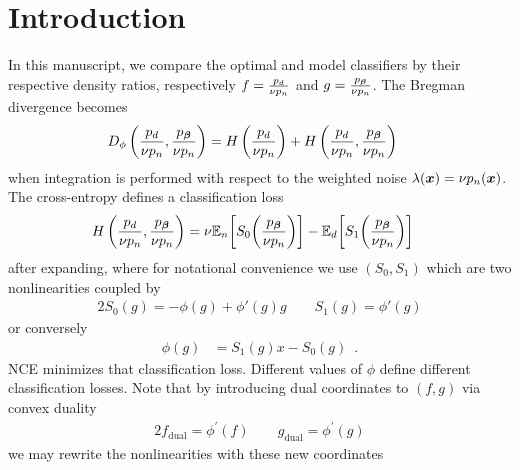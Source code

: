 
\newcommand{\pd}{{\color{black} p_d}}
\newcommand{\pn}{{\color{black} p_n}}

\section{Introduction}
\label{sec:intro}


In this manuscript, we compare the optimal and model classifiers by their respective density ratios, respectively $f = \frac{\pd}{\nu \pn}$ and $g = \frac{p_{\vbeta}}{\nu \pn}$. The Bregman divergence becomes
%
\begin{align*}
    D_{\phi} \left(
    \frac{\pd}{\nu \pn}
    , 
    \frac{p_{\vbeta}}{\nu \pn}
    \right)
    &=
    H \left( 
    \frac{\pd}{\nu \pn} 
    \right) 
    + 
    H \left( 
    \frac{\pd}{\nu \pn}
    ,
    \frac{p_{\vbeta}}{\nu \pn}
    \right) 
\end{align*}
%
when integration is performed with respect to the weighted noise $\lambda(\vx) = \nu \pn(\vx)$. The cross-entropy defines a classification loss 
%
\begin{align*}
    H \left( 
    \frac{\pd}{\nu \pn}
    ,
    \frac{p_{\vbeta}}{\nu \pn}
    \right) 
    &=
    \nu \E_n
    \bigg[
    S_0
    \bigg(
    \frac{p_\vbeta}{\nu \pn}
    \bigg)
    \bigg]
    -
    \E_d
    \bigg[
    S_1
    \bigg(
    \frac{p_\vbeta}{\nu \pn}
    \bigg)
    \bigg]
\end{align*}
%
after expanding, where for notational convenience we use $(S_0, S_1)$ which are two nonlinearities coupled by
%
\begin{alignat*}{2}
    S_0(g) = -\phi(g) + \phi'(g)g  
    \hspace{2em}
    S_1(g) = \phi'(g)
\end{alignat*}
%
\noindent or conversely
%
\begin{align*}
    \phi(g) &= S_1(g) x - S_0(g)
    \enspace .
\end{align*}
%
NCE minimizes that classification loss. Different values of $\phi$ define different classification losses. 
% 
Note that by introducing dual coordinates to $(f, g)$ via convex duality
%
\begin{alignat*}{2}
    f_{\mathrm{dual}} = \phi^{'}(f)
    \hspace{2em}
    g_{\mathrm{dual}} =  \phi^{'}(g)
\end{alignat*}
%
we may rewrite the nonlinearities with these new coordinates
